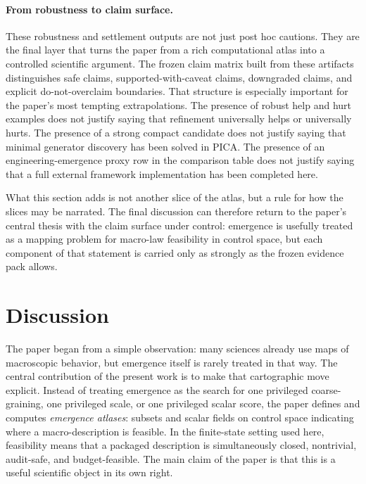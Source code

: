 \documentclass[11pt]{article}
\theoremstyle{definition}
\begin{document}
\paragraph{From robustness to claim surface.}
These robustness and settlement outputs are not just post hoc cautions. They are the final layer that turns the paper from a rich computational atlas into a controlled scientific argument. The frozen claim matrix built from these artifacts distinguishes safe claims, supported-with-caveat claims, downgraded claims, and explicit do-not-overclaim boundaries. That structure is especially important for the paper's most tempting extrapolations. The presence of robust help and hurt examples does not justify saying that refinement universally helps or universally hurts. The presence of a strong compact candidate does not justify saying that minimal generator discovery has been solved in PICA. The presence of an engineering-emergence proxy row in the comparison table does not justify saying that a full external framework implementation has been completed here.

What this section adds is not another slice of the atlas, but a rule for how the slices may be narrated. The final discussion can therefore return to the paper's central thesis with the claim surface under control: emergence is usefully treated as a mapping problem for macro-law feasibility in control space, but each component of that statement is carried only as strongly as the frozen evidence pack allows.
 \section{Discussion}\label{sec:discussion}

The paper began from a simple observation: many sciences already use maps of macroscopic behavior, but emergence itself is rarely treated in that way. The central contribution of the present work is to make that cartographic move explicit. Instead of treating emergence as the search for one privileged coarse-graining, one privileged scale, or one privileged scalar score, the paper defines and computes \emph{emergence atlases}: subsets and scalar fields on control space indicating where a macro-description is feasible. In the finite-state setting used here, feasibility means that a packaged description is simultaneously closed, nontrivial, audit-safe, and budget-feasible. The main claim of the paper is that this is a useful scientific object in its own right.
\end{document}

